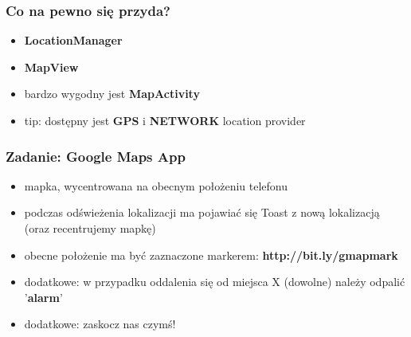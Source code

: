 \begin{frame}\frametitle{Co na pewno się przyda?}
\begin{itemize}
 \item \textbf{LocationManager}
 \item \textbf{MapView}
 \item bardzo wygodny jest \textbf{MapActivity}
 \item tip: dostępny jest \textbf{GPS} i \textbf{NETWORK} location provider
\end{itemize}
\end{frame}
 
\begin{frame}[fragile]\frametitle{Zadanie: Google Maps App}
\begin{itemize}
 \item mapka, wycentrowana na obecnym położeniu telefonu
 \item podczas odświeżenia lokalizacji ma pojawiać się Toast z nową lokalizacją (oraz recentrujemy mapkę)
 \item obecne położenie ma być zaznaczone markerem: \textbf{http://bit.ly/gmapmark}
 \item dodatkowe: w przypadku oddalenia się od miejsca X (dowolne) należy odpalić '\textbf{alarm}'
 \item dodatkowe: zaskocz nas czymś!
\end{itemize}
\end{frame}
